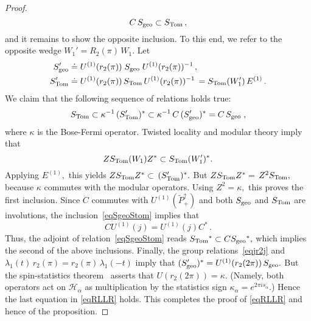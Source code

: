 \documentclass[a4paper,reqno,11pt]{amsart}
\theoremstyle{plain}
\theoremstyle{definition}
\numberwithin{equation}{section}
\newcommand{\calH}{{\mathcal H}}
\newcommand{\Potild}{\tilde{P}_+^{\uparrow}}
\newcommand{\dom}{{\rm dom }}
\renewcommand{\sec}{\alpha}
\newcommand{\Stom}{S_{\rm Tom}(W_1)}
\newcommand{\Stome}{S_{\rm Tom}} %
\newcommand{\Sgeo}{S_{\rm geo}}
\newcommand{\Sgeoe}{S_{\rm geo}}  %
\newcommand{\Hsec}{\calH_{\sec}}
\newcommand{\Ue}{U^{(1)}}
\newcommand{\Uej}{U^{(1)}(j)}
\newcommand{\Ee}{E^{(1)}}
\newcommand{\Cop}{C}        %
\begin{document}
\begin{proof}
\begin{equation}
  \Cop\,\Sgeoe \subset \Stome\,,
\end{equation} 
and it remains to show the opposite inclusion. To this end, 
we refer to the opposite wedge $W_1'=R_2(\pi)\, W_1.$ Let 
\begin{align*}
\Sgeoe'&\doteq\Ue(r_2(\pi))\;\Sgeoe\;\Ue(r_2(\pi))^{-1}\,,\\
\Stome'&\doteq\Ue(r_2(\pi))\,\Stome\,\Ue(r_2(\pi))^{-1}\,
=S_{\rm Tom}(W_1')\,\Ee\,.
\end{align*}
We claim that the following sequence of relations holds true: 
\begin{equation} \label{eqRLLR}
\Stome\subset \kappa^{-1}\,(\Stome')^*
\subset\kappa^{-1}\,\Cop\,(\Sgeo')^*=\Cop\,\Sgeoe\;,
\end{equation}
where $\kappa$ is the Bose-Fermi operator. 
Twisted locality and modular theory imply that 
\[ Z\Stom Z^*\subset S_{\rm Tom}(W_1')^*. \] 
Applying $\Ee,$ this yields $Z\Stome Z^*\subset$ $ (\Stome')^*.$ 
But $Z\Stome Z^*=$ $Z^2\Stome,$ because 
$\kappa$ commutes with the modular operators. Using $Z^2=\kappa,$ 
this proves the first inclusion. 
Since $\Cop$ commutes with $\Ue(\Potild)$ and both $\Sgeo$ and
$\Stome$ are involutions, the inclusion~\eqref{eqSgeoStom} implies that 
\begin{equation} \label{eqCj}
  \Cop\Uej=\Uej\Cop^*\,. 
\end{equation} 
Thus, the adjoint of relation~\eqref{eqSgeoStom} reads 
$\Stome{^*}\subset \Cop\Sgeoe{^*},$ which implies the second 
of the above inclusions.  
Finally, the group relations~\eqref{eqjr2j} and 
$\lambda_1(t)\,r_2(\pi) = r_2(\pi) \,\lambda_1(-t)$ 
imply that $(\Sgeoe')^*=\Ue(r_2(2\pi))\,\Sgeoe.$ But the
spin-statistics theorem~\cite{BuEp} asserts that $U(r_2(2\pi))=\kappa.$ 
(Namely, both operators act on $\Hsec$ as multiplication by the
statistics sign $\kappa_\sec=e^{2\pi i  s_\sec}.$) 
Hence the last equation 
in \eqref{eqRLLR} holds. 
This completes the proof of \eqref{eqRLLR} and hence of the proposition. 
\end{proof} 
\end{document}
